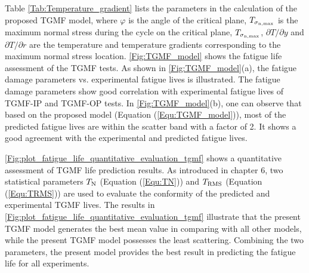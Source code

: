 Table \ref{Tab:Temperature_gradient} lists the parameters in the calculation of the proposed TGMF model, where $\varphi$ is the angle of the critical plane, $T_{\sigma_{\rm n,\max}}$ is the maximum normal stress during the cycle on the critical plane, $T_{\sigma_{\rm n,\max}}$, $\partial T/\partial y$ and $\partial T/\partial r$ are the temperature and temperature gradients corresponding to the maximum normal stress location.
\ref{Fig:TGMF_model} shows the fatigue life assessment of the TGMF tests. As shown in \ref{Fig:TGMF_model}(a), the fatigue damage parameters vs. experimental fatigue lives is illustrated. The fatigue damage parameters show good correlation with experimental fatigue lives of TGMF-IP and TGMF-OP tests. In \ref{Fig:TGMF_model}(b), one can observe that based on the proposed model (Equation (\ref{Equ:TGMF_model})), most of the predicted fatigue lives are within the scatter band with a factor of 2. It shows a good agreement with the experimental and predicted fatigue lives.

\ref{Fig:plot_fatigue_life_quantitative_evaluation_tgmf} shows a quantitative assessment of TGMF life prediction results. As introduced in chapter 6, two statistical parameters ${T_{\rm N}}$ (Equation (\ref{Equ:TN})) and ${T_{\rm RMS}}$ (Equation (\ref{Equ:TRMS})) are used to evaluate the conformity of the predicted and experimental TGMF lives. The results in \ref{Fig:plot_fatigue_life_quantitative_evaluation_tgmf} illustrate that the present TGMF model generates the best mean value in comparing with all other models, while the present TGMF model possesses the least scattering. Combining the two parameters, the present model provides the best result in predicting the fatigue life for all experiments.

